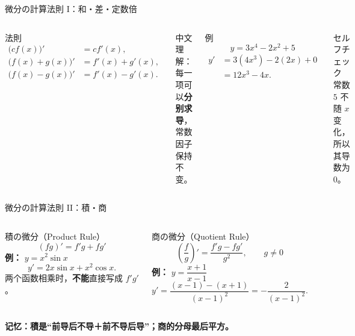 \documentclass[notheorems,aspectratio=169]{beamer}
\newcommand{\jp}[1]{\textbf{\color{JapanBlue}#1}}
\newcommand{\key}[1]{\textbf{\color{ChinaRed}#1}}
\begin{document}
\begin{frame}{微分の計算法則 I：和・差・定数倍}
  \begin{columns}[T,onlytextwidth]
    \begin{block}{法則}
      \begin{align*}
        \bigl(cf(x)\bigr)' &= c f'(x),\\
        \bigl(f(x)+g(x)\bigr)' &= f'(x)+g'(x),\\
        \bigl(f(x)-g(x)\bigr)' &= f'(x)-g'(x).
      \end{align*}
    \end{block}
    中文理解：每一项可以\key{分别求导}，常数因子保持不变。

    \begin{alertblock}{例}
      \[
        y=3x^4-2x^2+5
      \]
      \begin{align*}
        y'
          &=3(4x^3)-2(2x)+0\\
          &=\boxed{12x^3-4x}.
      \end{align*}
    \end{alertblock}
    \begin{block}{セルフチェック}
      常数 $5$ 不随 $x$ 变化，所以其导数为 $0$。
    \end{block}
  \end{columns}
\end{frame}

\begin{frame}{微分の計算法則 II：積・商}
  \begin{columns}[T,onlytextwidth]
    \begin{block}{積の微分（Product Rule）}
      \[
        (fg)'=f'g+fg'
      \]
      \textbf{例：} $y=x^2\sin x$
      \[
        y'=2x\sin x+x^2\cos x.
      \]
      两个函数相乘时，\key{不能}直接写成 $f'g'$。
    \end{block}

    \begin{alertblock}{商の微分（Quotient Rule）}
      \[
        \left(\frac{f}{g}\right)'
        =\frac{f'g-fg'}{g^2},\qquad g\neq0
      \]
      \textbf{例：} $y=\dfrac{x+1}{x-1}$
      \[
        y'=\frac{(x-1)-(x+1)}{(x-1)^2}
        =\boxed{-\frac{2}{(x-1)^2}}.
      \]
    \end{alertblock}
  \end{columns}

  \centering
  \vspace{0.4em}
  \jp{记忆：積是“前导后不导＋前不导后导”；商的分母最后平方。}
\end{frame}
\end{document}
